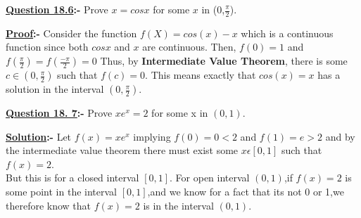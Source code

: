 \documentclass[12pt]{article}
\begin{document}
\vspace{1cm}

\begin{mdframed}[style=MyFrame]
{\bf{\underline{Question 18.6}:-}} Prove $x=cosx$ for some $x$ in (0,$\frac{\pi}{2}$).\\
\end{mdframed}

\vspace{1cm}
\textbf{\underline{Proof}:-} Consider the function $f(X)=cos(x)-x$ which is a continuous function since both $cosx$ and $x$ are continuous.
Then, $f(0)=1$ and $f(\frac{\pi}{2})=f(\frac{-\pi}{2}) = 0$
Thus, by \textbf{Intermediate Value Theorem}, there is some $c\in(0,\frac{\pi}{2})$ such that $f(c)=0$. This means exactly that $cos(x)=x$ has a solution in the interval $(0,\frac{\pi}{2}).$

\vspace{1cm}

\begin{mdframed}[style=MyFrame]
\textbf{\underline{Question 18. 7}:-} Prove $x{e^x}=2$ for some x in $(0,1)$.
\end{mdframed}
\vspace*{1cm}

\textbf{\underline{Solution}:-} Let $f(x)=x{e^x}$ implying $f(0)=0<2$ and $f(1)=e>2$ and by the intermediate value theorem there must exist some $x\epsilon{[0,1]}$ such that $f(x)=2$.\\
But this is for a closed interval $[0,1]$.
For open interval $(0,1)$,if $f(x)=2$ is some point in the interval $[0,1]$,and we know for a fact that its not 0 or 1,we therefore know that $f(x)=2$ is in the interval $(0,1)$.

\vspace{1cm}
\end{document}
